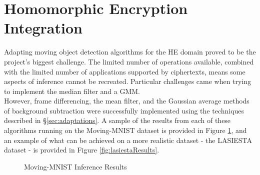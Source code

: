 \setlength{\leftskip}{0cm}




\section{Homomorphic Encryption Integration}
\label{sec:integration}
\setlength{\leftskip}{0.25cm}
\indent \indent
Adapting moving object detection algorithms for the HE domain proved to be the project's biggest challenge. The limited number of operations available, combined with the limited number of applications supported by ciphertexts, means some aspects of inference cannot be recreated. Particular challenges came when trying to implement the median filter and a GMM.
\smallskip \\ \indent
However, frame differencing, the mean filter, and the Gaussian average methods of background subtraction were successfully implemented using the techniques described in §\ref{sec:adaptations}. A sample of the results from each of these algorithms running on the Moving-MNIST dataset is provided in Figure \ref{fig:inferenceResults}, and an example of what can be achieved on a more realistic dataset - the LASIESTA dataset - is provided in Figure \ref{fig:lasiestaResults}.
\begin{figure}
    \centering
    
    \caption{Moving-MNIST Inference Results}
    \label{fig:inferenceResults}
\end{figure}
\setlength{\leftskip}{0cm}
